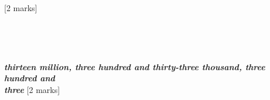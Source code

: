 \documentclass{article}
\begin{document}
    
    


    
    
    


\quad {}   \hspace{2cm} [2 marks]
 \par
 \vspace{20pt}

\noindent \dotuline{\hspace{17cm}} \\
\par
\noindent \dotuline{\hspace{17cm}} \\
\vspace{10pt}
\hline
\vspace{10pt}

\quad {} \textit{\textbf{thirteen million, three hundred and thirty-three thousand, three hundred and }} \\
\textit{\textbf{three}}  \hspace{2cm} [2 marks]
\end{document}
